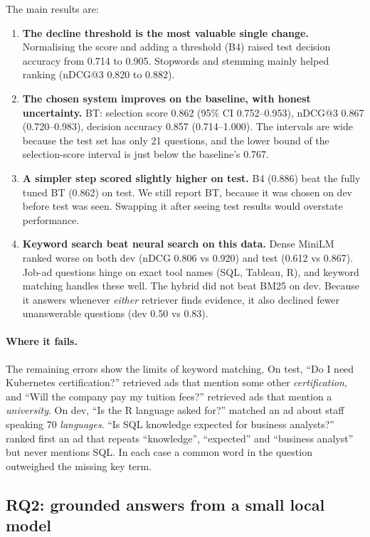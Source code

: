 The main results are:

\begin{enumerate}
  \item \textbf{The decline threshold is the most valuable single change.} Normalising the score and adding a threshold (B4) raised test decision accuracy from 0.714 to 0.905. Stopwords and stemming mainly helped ranking (nDCG@3 0.820 to 0.882).
  \item \textbf{The chosen system improves on the baseline, with honest uncertainty.} BT: selection score 0.862 (95\% CI 0.752--0.953), nDCG@3 0.867 (0.720--0.983), decision accuracy 0.857 (0.714--1.000). The intervals are wide because the test set has only 21 questions, and the lower bound of the selection-score interval is just below the baseline's 0.767.
  \item \textbf{A simpler step scored slightly higher on test.} B4 (0.886) beat the fully tuned BT (0.862) on test. We still report BT, because it was chosen on dev before test was seen. Swapping it after seeing test results would overstate performance.
  \item \textbf{Keyword search beat neural search on this data.} Dense MiniLM ranked worse on both dev (nDCG 0.806 vs 0.920) and test (0.612 vs 0.867). Job-ad questions hinge on exact tool names (SQL, Tableau, R), and keyword matching handles these well. The hybrid did not beat BM25 on dev. Because it answers whenever \emph{either} retriever finds evidence, it also declined fewer unanswerable questions (dev 0.50 vs 0.83).
\end{enumerate}

\paragraph{Where it fails.} The remaining errors show the limits of keyword matching. On test, ``Do I need Kubernetes certification?'' retrieved ads that mention some other \emph{certification}, and ``Will the company pay my tuition fees?'' retrieved ads that mention a \emph{university}. On dev, ``Is the R language asked for?'' matched an ad about staff speaking 70 \emph{languages}. ``Is SQL knowledge expected for business analysts?'' ranked first an ad that repeats ``knowledge'', ``expected'' and ``business analyst'' but never mentions SQL. In each case a common word in the question outweighed the missing key term.

\subsection{RQ2: grounded answers from a small local model}\label{sec:rq2}

